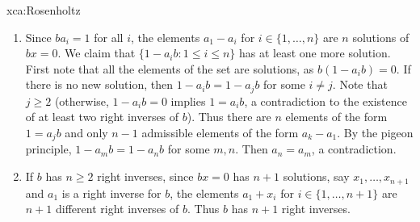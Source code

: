 \begin{sol}{xca:Rosenholtz}
\begin{enumerate}
    \item Since $ba_i=1$ for all $i$, the elements $a_1-a_i$ for $i\in\{1,\dots,n\}$ 
    are $n$ solutions of $bx=0$. We claim that $\{1-a_ib:1\leq i\leq n\}$ has at least
    one more solution. First note that all the elements of the set are solutions, as
    $b(1-a_ib)=0$. If there is no new solution, then $1-a_ib=1-a_jb$ for some $i\ne j$. Note that 
    $j\geq2$ (otherwise, $1-a_ib=0$ implies $1=a_ib$, a contradiction to the existence of at least 
    two right inverses of $b$). Thus there are $n$ elements of the form 
    $1=a_jb$ and only $n-1$ admissible elements of the form $a_k-a_1$. By the pigeon principle,
    $1-a_mb=1-a_nb$ for some $m,n$. Then $a_n=a_m$, a contradiction. 

    \item If $b$ has $n\geq2$ right inverses, since $bx=0$ 
    has $n+1$ solutions, say $x_1,\dots,x_{n+1}$ and $a_1$ is a right inverse for $b$, 
    the elements $a_1+x_i$ for $i\in\{1,\dots,n+1\}$ are $n+1$ different right inverses of $b$. Thus 
    $b$ has $n+1$ right inverses. 
\end{enumerate}
\end{sol}

